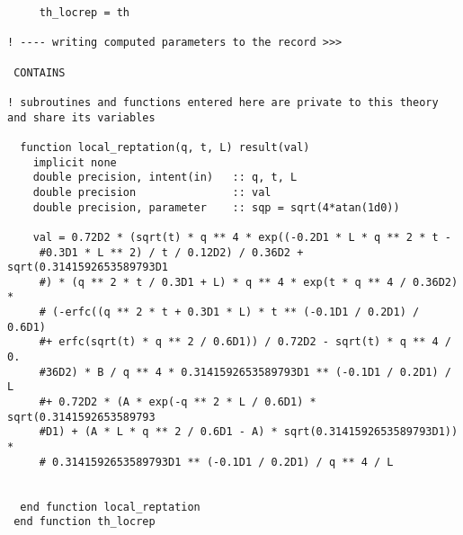 \documentclass{article}
\begin{document}
\begin{verbatim}
     th_locrep = th
 
! ---- writing computed parameters to the record >>>  
 
 CONTAINS 
 
! subroutines and functions entered here are private to this theory and share its variables 
 
  function local_reptation(q, t, L) result(val)
    implicit none
    double precision, intent(in)   :: q, t, L
    double precision               :: val
    double precision, parameter    :: sqp = sqrt(4*atan(1d0))

    val = 0.72D2 * (sqrt(t) * q ** 4 * exp((-0.2D1 * L * q ** 2 * t -
     #0.3D1 * L ** 2) / t / 0.12D2) / 0.36D2 + sqrt(0.3141592653589793D1
     #) * (q ** 2 * t / 0.3D1 + L) * q ** 4 * exp(t * q ** 4 / 0.36D2) *
     # (-erfc((q ** 2 * t + 0.3D1 * L) * t ** (-0.1D1 / 0.2D1) / 0.6D1)
     #+ erfc(sqrt(t) * q ** 2 / 0.6D1)) / 0.72D2 - sqrt(t) * q ** 4 / 0.
     #36D2) * B / q ** 4 * 0.3141592653589793D1 ** (-0.1D1 / 0.2D1) / L
     #+ 0.72D2 * (A * exp(-q ** 2 * L / 0.6D1) * sqrt(0.3141592653589793
     #D1) + (A * L * q ** 2 / 0.6D1 - A) * sqrt(0.3141592653589793D1)) *
     # 0.3141592653589793D1 ** (-0.1D1 / 0.2D1) / q ** 4 / L


  end function local_reptation
 end function th_locrep
\end{verbatim}
\normalsize
\end{document}
